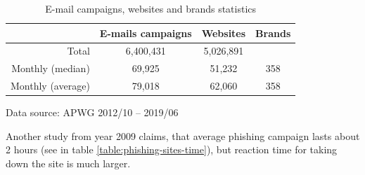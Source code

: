 \documentclass[
  digital, %
  oneside, %
  table,   %
  nolof,     %
  nolot,     %
]{fithesis3}
\begin{document}
\begin{table}[h!]
    
    \begin{tabular}{r|ccc}
    \hline
    \multicolumn{1}{l|}{} & \multicolumn{1}{r}{E-mails campaigns} & Websites  & Brands \\ \hline
    Total                 & 6,400,431                             & 5,026,891 &        \\
    Monthly (median)      & 69,925                                & 51,232    & 358    \\
    Monthly (average)     & 79,018                                & 62,060    & 358    \\ \hline
    \end{tabular}\par
    \caption{E-mail campaigns, websites and brands statistics}
    \bigskip
    Data source: APWG 2012/10 -- 2019/06
    \label{table:apwg-trends}
\end{table}

Another study from year 2009 \cite{empirical-analysis-blacklists} claims, that average phishing campaign lasts about 2 hours (see in table \ref{table:phishing-sites-time}), but reaction time for taking down the site is much larger.
\end{document}
